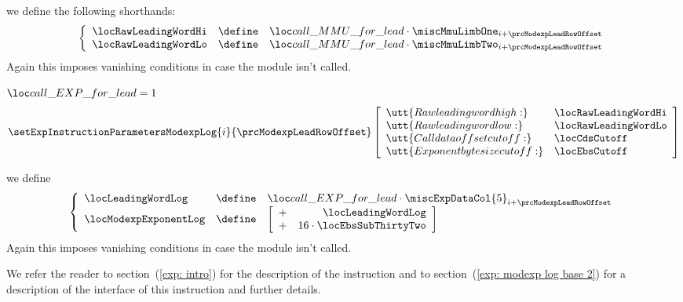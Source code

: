 \begin{description}
\begin{description}
\[{						}
					\]
				\item[\underline{Setting some shorthands:}] 
					we define the following shorthands:
					\[
						\left\{ \begin{array}{lcl}
							\locRawLeadingWordHi & \define & \locCallMmuForModexpLead \cdot \miscMmuLimbOne _{i + \prcModexpLeadRowOffset} \\
							\locRawLeadingWordLo & \define & \locCallMmuForModexpLead \cdot \miscMmuLimbTwo _{i + \prcModexpLeadRowOffset} \\
						\end{array} \right.
					\]
					\saNote{} Again this imposes vanishing conditions in case the \mmuMod{} module isn't called.
				\item[\underline{Setting \expMod{} values:}] 
					\If $\locCallExpForModexpLead = 1$ \Then
					\[
						\setExpInstructionParametersModexpLog {i}{\prcModexpLeadRowOffset}
						\left[ \begin{array}{ll}
							\utt{Raw leading word high:}     & \locRawLeadingWordHi  \\
							\utt{Raw leading word low:}      & \locRawLeadingWordLo  \\
							\utt{Call data offset cutoff:}   & \locCdsCutoff         \\
							\utt{Exponent byte size cutoff:} & \locEbsCutoff         \\
						\end{array} \right]
					\]
				\item[\underline{Setting some shorthands:}] 
					we define
					\[
						\left\{ \begin{array}{lcl}
							\locLeadingWordLog    & \define & \locCallExpForModexpLead \cdot \miscExpDataCol{5}_{i + \prcModexpLeadRowOffset} \\
							\locModexpExponentLog & \define &
							\left[ \begin{array}{cr}
								+ & \locLeadingWordLog \\
								+ & 16 \cdot \locEbsSubThirtyTwo           \\
							\end{array} \right] \\
						\end{array} \right.
					\]
				\saNote{}
				Again this imposes vanishing conditions in case the \expMod{} module isn't called.
			\end{description}
		\end{description}
		\saNote{} We refer the reader to 
		section~(\ref{exp: intro}) for the description of the \expInstModexpLog{} instruction and to
		section~(\ref{exp: modexp log base 2}) for a description of the interface of this instruction and further details.

